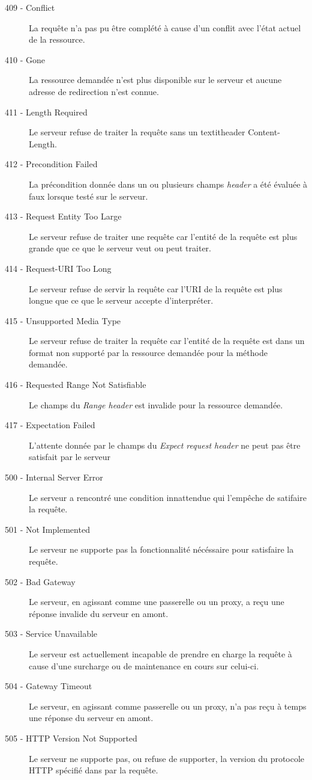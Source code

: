 \documentclass{scrreprt}
\begin{document}
\begin{description}
 \item [409 - Conflict] La requête n'a pas pu être complété à cause d'un conflit avec l'état actuel de la ressource.
 \item [410 - Gone] La ressource demandée n'est plus disponible sur le serveur et aucune adresse de redirection n'est connue.
 \item [411 - Length Required] Le serveur refuse de traiter la requête sans un textit{header} Content-Length.
 \item [412 - Precondition Failed] La précondition donnée dans un ou plusieurs champs \textit{header} a été évaluée à faux lorsque testé sur le serveur.
 \item [413 - Request Entity Too Large] Le serveur refuse de traiter une requête car l'entité de la requête est plus grande que ce que le serveur veut ou peut traiter.
 \item [414 - Request-URI Too Long] Le serveur refuse de servir la requête car l'URI de la requête est plus longue que ce que le serveur accepte d'interpréter.
 \item [415 - Unsupported Media Type] Le serveur refuse de traiter la requête car l'entité de la requête est dans un format non supporté par la ressource demandée pour la méthode demandée.
 \item [416 - Requested Range Not Satisfiable] Le champs du \textit{Range header} est invalide pour la ressource demandée.
 \item [417 - Expectation Failed] L'attente donnée par le champs du \textit{Expect request header} ne peut pas être satisfait par le serveur
 \item [500 - Internal Server Error] Le serveur a rencontré une condition innattendue qui l'empêche de satifaire la requête.
 \item [501 - Not Implemented] Le serveur ne supporte pas la fonctionnalité nécéssaire pour satisfaire la requête.
 \item [502 - Bad Gateway] Le serveur, en agissant comme une passerelle ou un proxy, a reçu une réponse invalide du serveur en amont.
 \item [503 - Service Unavailable] Le serveur est actuellement incapable de prendre en charge la requête à cause d'une surcharge ou de maintenance en cours sur celui-ci.
 \item [504 - Gateway Timeout] Le serveur, en agissant comme passerelle ou un proxy, n'a pas reçu à temps une réponse du serveur en amont.
 \item [505 - HTTP Version Not Supported] Le serveur ne supporte pas, ou refuse de supporter, la version du protocole HTTP spécifié dans par la requête.
 \end{description}
 
\end{document}
